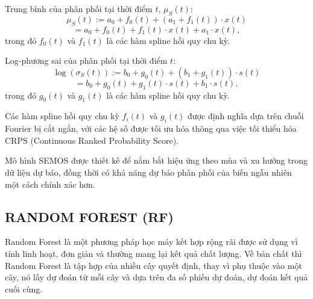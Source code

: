 \documentclass[conference]{IEEEtran}
\begin{document}
 Trung bình của phân phối tại thời điểm \(t\), \(\mu_S(t)\):
    \[\mu_S(t) := a_0 + f_0(t) + (a_1 + f_1(t)) \cdot x(t)\]
    \[= a_0 + f_0(t) + f_1(t) \cdot x(t) + a_1 \cdot x(t),\]
    trong đó \(f_0(t)\) và \(f_1(t)\) là các hàm spline hồi quy chu kỳ.

Log-phương sai của phân phối tại thời điểm \(t\):
    \[\log(\sigma_S(t)) := b_0 + g_0(t) + (b_1 + g_1(t)) \cdot s(t)\]
    \[= b_0 + g_0(t) + g_1(t) \cdot s(t) + b_1 \cdot s(t),\]
    trong đó \(g_0(t)\) và \(g_1(t)\) là các hàm spline hồi quy chu kỳ.

Các hàm spline hồi quy chu kỳ \(f_i(t)\) và \(g_i(t)\) được định nghĩa dựa trên chuỗi Fourier bị cắt ngắn, với các hệ số được tối ưu hóa thông qua việc tối thiểu hóa CRPS (Continuous Ranked Probability Score).

Mô hình SEMOS được thiết kế để nắm bắt hiệu ứng theo mùa và xu hướng trong dữ liệu dự báo, đồng thời có khả năng dự báo phân phối của biến ngẫu nhiên một cách chính xác hơn.

\subsection{RANDOM FOREST (RF)}
Random Forest là một phương pháp học máy kết hợp rộng rãi được sử dụng vì tính linh hoạt, đơn giản và thường mang lại kết quả chất lượng. Về bản chất thì Random Forest là tập hợp của nhiều cây quyết định, thay vì phụ thuộc vào một cây, nó lấy dự đoán từ mỗi cây và dựa trên đa số phiếu dự đoán, dự đoán kết quả cuối cùng.
\end{document}
